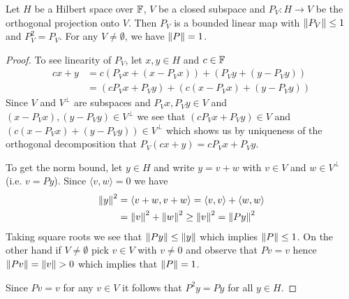 \begin{prop}\label{hilbert:OrthogonalProjections}Let $H$ be a Hilbert
  space over $\mathbb{F}$,  $V$ be a closed subspace and $P_V : H \to V$ be the orthogonal
  projection onto $V$.   Then $P_V$ is a bounded linear map with
  $\left \lVert P_V \right \rVert \leq 1$ and $P_V^2 = P_V$.   For any $V \neq \emptyset$,
  we have $\left \lVert P \right \rVert = 1$.
\end{prop}
\begin{proof}
 To see linearity of $P_V$,  let $x, y \in H$ and $c \in \mathbb{F}$
  \begin{align*}
    cx + y &= c\left( P_Vx + \left(x - P_Vx \right) \right) + \left(P_Vy +
             \left(y - P_Vy \right) \right) \\
    &= \left( cP_Vx + P_V y \right) + \left( c\left(x - P_V x \right)
      + \left(y - P_V y \right) \right)
  \end{align*}
 Since $V$ and $V^\perp$ are subspaces and $P_Vx, P_V y \in V$ and $\left(x
 - P_V x\right), \left(y - P_Vy \right) \in V^\perp$ we see that
$\left( cP_Vx + P_V y \right) \in V$ and $\left( c\left(x - P_V x \right)
      + \left(y - P_V y \right) \right) \in V^\perp$ which shows us by
    uniqueness of the orthogonal decomposition 
    that $P_V(cx +y) = cP_Vx + P_Vy$.

To get the norm bound, let $y \in H$ and write $y = v + w$ with $v \in
V$ and $w \in V^\perp$ (i.e. $v = Py$).   Since $\langle v, w \rangle = 0$ we have
\begin{align*}
  \left \lVert y \right \rVert^2 &= \langle v + w , v+ w \rangle = \langle v , v \rangle +
               \langle w, w \rangle \\
  &= \left \lVert v \right \rVert^2 + \left \lVert w \right \rVert^2 \geq \left \lVert v \right \rVert^2 = \left \lVert Py \right \rVert^2
\end{align*}
Taking square roots we see that $\left \lVert Py \right \rVert \leq \left \lVert y \right \rVert$ which
implies $\left \lVert P \right \rVert \leq 1$.   On the other hand if $V \neq \emptyset$
pick $v \in V$  with $v \neq 0$ and observe that $Pv = v$ hence
$\left \lVert Pv \right \rVert = \left \lVert v \right \rVert > 0$ which implies that $\left \lVert P \right \rVert =1$.

Since $Pv = v$ for any $v \in V$ it follows that $P^2 y = Py$ for all
$y \in H$.
\end{proof}

